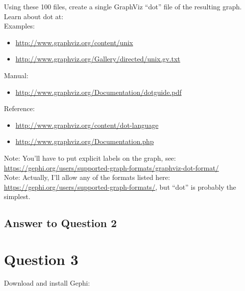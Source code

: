 \documentclass{article}
\begin{document}
Using these 100 files, create a single GraphViz ``dot'' file of the resulting graph. Learn about dot at: \\

Examples:
\begin{itemize}
\item \url{http://www.graphviz.org/content/unix}
\item \url{http://www.graphviz.org/Gallery/directed/unix.gv.txt}
\end{itemize}

Manual:
\begin{itemize}
\item \url{http://www.graphviz.org/Documentation/dotguide.pdf}
\end{itemize}

Reference:
\begin{itemize}
\item \url{http://www.graphviz.org/content/dot-language}
\item \url{http://www.graphviz.org/Documentation.php}
\end{itemize}

Note: You'll have to put explicit labels on the graph, see: \url{https://gephi.org/users/supported-graph-formats/graphviz-dot-format/} \\

Note: Actually, I'll allow any of the formats listed here: \url{https://gephi.org/users/supported-graph-formats/}, but ``dot'' is probably the simplest.


\subsection*{Answer to Question 2}


\clearpage

\section*{Question 3}
Download and install Gephi: \\
\url{}
\end{document}
